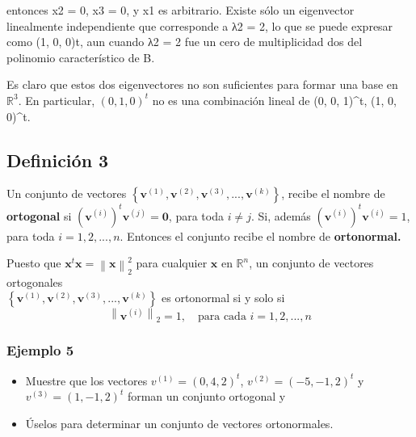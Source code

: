 \documentclass{report}
\numberwithin{subsection}{section} %
\begin{document}
    entonces x2 = 0, x3 = 0, y x1 es arbitrario. Existe sólo un eigenvector linealmente independiente que corresponde a λ2 = 2, lo que se puede expresar como (1, 0, 0)t, aun cuando λ2 = 2 fue un cero de multiplicidad dos del polinomio característico de B.

    Es claro que estos dos eigenvectores no son suficientes para formar una base en $\mathbb{R}^3$. En particular, $(0, 1, 0)^t$ no es una combinación lineal de {(0, 0, 1)^t, (1, 0, 0)^t}.

\subsection{\textnormal{Definición 3}}

Un conjunto de vectores $\left\{ \textbf{v}^{\left( 1 \right)}, \textbf{v}^{\left( 2 \right)}, \textbf{v}^{\left( 3 \right)}, ..., \textbf{v}^{\left( k \right)} \right\}$, recibe el nombre de \textbf{ortogonal} si $\left( \textbf{v}^{\left( i \right)} \right)^{t}\textbf{v}^{\left( j \right)} = \textbf{0}$, para toda $i\neq j$. Si, además $\left( \textbf{v}^{\left( i \right)} \right)^{t}\textbf{v}^{\left( i \right)} = 1$, para toda $i = 1, 2, ..., n$. Entonces el conjunto recibe el nombre de \textbf{ortonormal.}

Puesto que $\textbf{x}^{t}\textbf{x}=\left\| \textbf{x} \right\|_{2}^{2}$ para  cualquier $\textbf{x}$ en $\mathbb{R}^{n}$, un conjunto de vectores ortogonales \\$\left\{ \textbf{v}^{\left( 1 \right)}, \textbf{v}^{\left( 2 \right)}, \textbf{v}^{\left( 3 \right)}, ..., \textbf{v}^{\left( k \right)} \right\}$ es ortonormal si y solo si
\begin{equation*}
\left\| \textbf{v}^{\left( i \right)} \right\|_{2} = 1, \quad \text{para cada } i = 1, 2, ..., n
\end{equation*}

\subsubsection*{Ejemplo 5}

\begin{itemize}
    \item Muestre que los vectores $v^{(1)} = (0, 4, 2)^t$, $v^{(2)} = (-5,-1, 2)^t$ y $v^{(3)} = (1,-1, 2)^t$ forman un conjunto ortogonal y
    \item Úselos para determinar un conjunto de vectores ortonormales.
\end{itemize}
\end{document}

